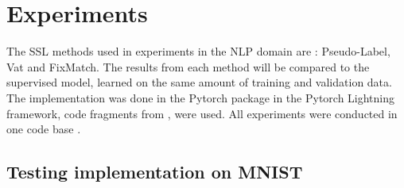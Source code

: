 \documentclass[12pt]{article}
\theoremstyle{definition}
\DeclareRobustCommand{\[}{\begin{equation}}
\DeclareRobustCommand{\]}{\end{equation}}
\begin{document}
           
\section{Experiments}
The SSL methods used in experiments in the NLP domain are : Pseudo-Label, Vat and FixMatch. The results from each method will be compared to the supervised model, learned on the same amount of training and validation data.
The implementation was done in the Pytorch package in the Pytorch Lightning framework, code fragments from \cite{pytorch_fm}, \cite{pytorch_vat} were used. All experiments were conducted in one code base \cite{composable_framework}.
\subsection{Testing implementation on MNIST}
\begin{minipage}{0.4\linewidth}
\begin{figure}[H]

\end{figure}
\end{minipage}
\end{document}
